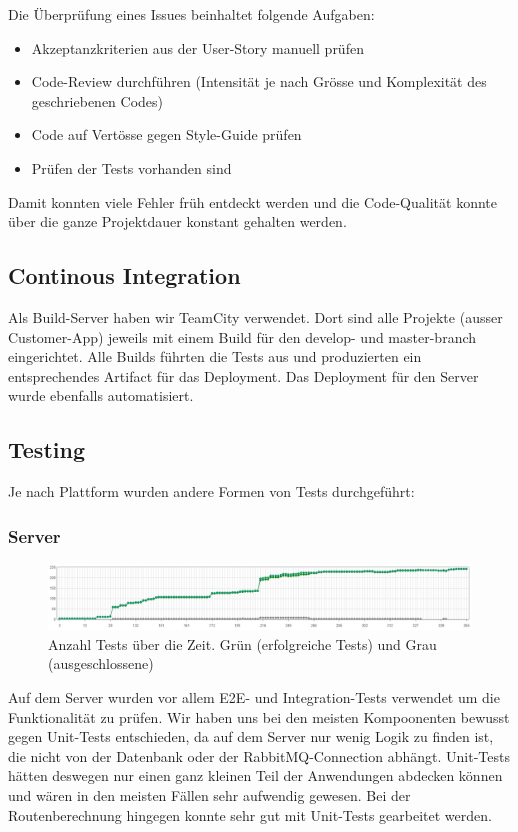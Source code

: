 Die Überprüfung eines Issues beinhaltet folgende Aufgaben:

\begin{itemize}
	\item{Akzeptanzkriterien aus der User-Story manuell prüfen}
	\item{Code-Review durchführen (Intensität je nach Grösse und Komplexität des geschriebenen Codes)}
	\item{Code auf Vertösse gegen Style-Guide prüfen}
	\item{Prüfen der Tests vorhanden sind}
\end{itemize}

Damit konnten viele Fehler früh entdeckt werden und die Code-Qualität konnte über die ganze Projektdauer konstant gehalten werden.

\subsection{Continous Integration}

Als Build-Server haben wir TeamCity verwendet. Dort sind alle Projekte (ausser Customer-App) jeweils mit einem Build für den develop- und master-branch eingerichtet. Alle Builds führten die Tests aus und produzierten ein entsprechendes Artifact für das Deployment. Das Deployment für den Server wurde ebenfalls automatisiert.

\subsection{Testing}

Je nach Plattform wurden andere Formen von Tests durchgeführt:

\subsubsection{Server}
\begin{figure}[h]
	\centering
	\includegraphics[width=1\textwidth] {images/test-count-chart.png}
	\caption{Anzahl Tests über die Zeit. Grün (erfolgreiche Tests) und Grau (ausgeschlossene)}
\end{figure}

Auf dem Server wurden vor allem \Gls{E2E}- und \Gls{Integration}-Tests verwendet um die Funktionalität zu prüfen. Wir haben uns bei den meisten Kompoonenten bewusst gegen Unit-Tests entschieden, da auf dem Server nur wenig Logik zu finden ist, die nicht von der Datenbank oder der RabbitMQ-Connection abhängt. Unit-Tests hätten deswegen nur einen ganz kleinen Teil der Anwendungen abdecken können und wären in den meisten Fällen sehr aufwendig gewesen. Bei der Routenberechnung hingegen konnte sehr gut mit Unit-Tests gearbeitet werden.\\

